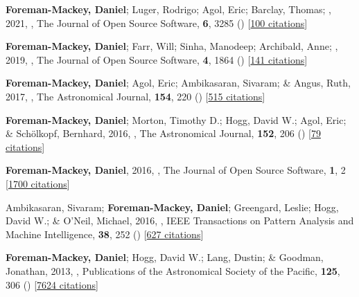 \item[{\color{numcolor}\scriptsize7}] \textbf{Foreman-Mackey, Daniel}; Luger, Rodrigo; Agol, Eric; Barclay, Thomas; \etal, 2021, , The Journal of Open Source Software, \textbf{6}, 3285 () [\href{https://ui.adsabs.harvard.edu/abs/2021JOSS....6.3285F}{100 citations}]

\item[{\color{numcolor}\scriptsize6}] \textbf{Foreman-Mackey, Daniel}; Farr, Will; Sinha, Manodeep; Archibald, Anne; \etal, 2019, , The Journal of Open Source Software, \textbf{4}, 1864 () [\href{https://ui.adsabs.harvard.edu/abs/2019JOSS....4.1864F}{141 citations}]

\item[{\color{numcolor}\scriptsize5}] \textbf{Foreman-Mackey, Daniel}; Agol, Eric; Ambikasaran, Sivaram; \& Angus, Ruth, 2017, , The Astronomical Journal, \textbf{154}, 220 () [\href{https://ui.adsabs.harvard.edu/abs/2017AJ....154..220F}{515 citations}]

\item[{\color{numcolor}\scriptsize4}] \textbf{Foreman-Mackey, Daniel}; Morton, Timothy D.; Hogg, David W.; Agol, Eric; \& Sch{\"o}lkopf, Bernhard, 2016, , The Astronomical Journal, \textbf{152}, 206 () [\href{https://ui.adsabs.harvard.edu/abs/2016AJ....152..206F}{79 citations}]

\item[{\color{numcolor}\scriptsize3}] \textbf{Foreman-Mackey, Daniel}, 2016, , The Journal of Open Source Software, \textbf{1}, 2 [\href{https://scholar.google.com/scholar?cites=1835087844145558435,17325274697099535179,14220488595059618709,12820425635803494730,7284810048757141243,17415935839493019063}{1700 citations}]

\item[{\color{numcolor}\scriptsize2}] Ambikasaran, Sivaram; \textbf{Foreman-Mackey, Daniel}; Greengard, Leslie; Hogg, David W.; \& O'Neil, Michael, 2016, , IEEE Transactions on Pattern Analysis and Machine Intelligence, \textbf{38}, 252 () [\href{https://scholar.google.com/scholar?cites=7122560326210979193,5194420368165307096,3347404430934682534}{627 citations}]

\item[{\color{numcolor}\scriptsize1}] \textbf{Foreman-Mackey, Daniel}; Hogg, David W.; Lang, Dustin; \& Goodman, Jonathan, 2013, , Publications of the Astronomical Society of the Pacific, \textbf{125}, 306 () [\href{https://ui.adsabs.harvard.edu/abs/2013PASP..125..306F}{7624 citations}]